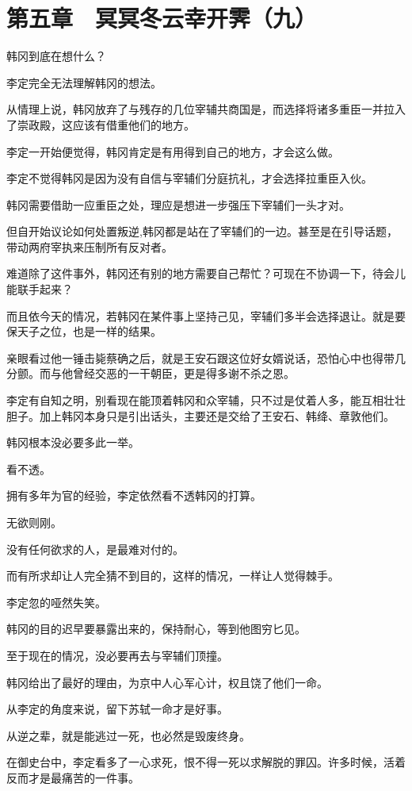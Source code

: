 \section{第五章　冥冥冬云幸开霁（九）}

韩冈到底在想什么？

李定完全无法理解韩冈的想法。

从情理上说，韩冈放弃了与残存的几位宰辅共商国是，而选择将诸多重臣一并拉入了崇政殿，这应该有借重他们的地方。

李定一开始便觉得，韩冈肯定是有用得到自己的地方，才会这么做。

李定不觉得韩冈是因为没有自信与宰辅们分庭抗礼，才会选择拉重臣入伙。

韩冈需要借助一应重臣之处，理应是想进一步强压下宰辅们一头才对。

但自开始议论如何处置叛逆,韩冈都是站在了宰辅们的一边。甚至是在引导话题，带动两府宰执来压制所有反对者。

难道除了这件事外，韩冈还有别的地方需要自己帮忙？可现在不协调一下，待会儿能联手起来？

而且依今天的情况，若韩冈在某件事上坚持己见，宰辅们多半会选择退让。就是要保天子之位，也是一样的结果。

亲眼看过他一锤击毙蔡确之后，就是王安石跟这位好女婿说话，恐怕心中也得带几分颤。而与他曾经交恶的一干朝臣，更是得多谢不杀之恩。

李定有自知之明，别看现在能顶着韩冈和众宰辅，只不过是仗着人多，能互相壮壮胆子。加上韩冈本身只是引出话头，主要还是交给了王安石、韩绛、章敦他们。

韩冈根本没必要多此一举。

看不透。

拥有多年为官的经验，李定依然看不透韩冈的打算。

无欲则刚。

没有任何欲求的人，是最难对付的。

而有所求却让人完全猜不到目的，这样的情况，一样让人觉得棘手。

李定忽的哑然失笑。

韩冈的目的迟早要暴露出来的，保持耐心，等到他图穷匕见。

至于现在的情况，没必要再去与宰辅们顶撞。

韩冈给出了最好的理由，为京中人心军心计，权且饶了他们一命。

从李定的角度来说，留下苏轼一命才是好事。

从逆之辈，就是能逃过一死，也必然是毁废终身。

在御史台中，李定看多了一心求死，恨不得一死以求解脱的罪囚。许多时候，活着反而才是最痛苦的一件事。

